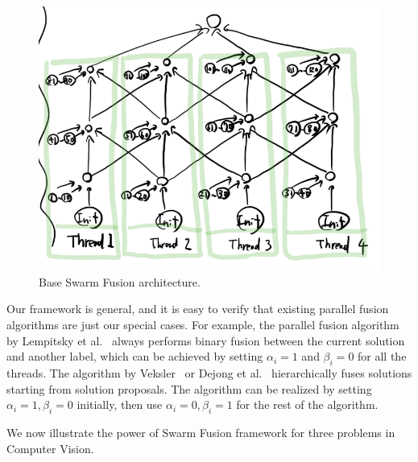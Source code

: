 \begin{figure}[tb]
 \includegraphics[width=\columnwidth]{figure/base_illustration.png}
 \caption{Base Swarm Fusion architecture.}\label{fig:base}
\end{figure}

 Our framework is
general, and it is easy to verify that existing parallel fusion
algorithms are just our special cases.
%
For example, the parallel fusion algorithm by Lempitsky et
al.~\cite{viktor} always performs binary fusion between the current
solution and another label, which can be achieved by setting $\alpha_i =
1$ and $\beta_i = 0$ for all the threads. The algorithm by
Veksler~\cite{olga} or Dejong et al.~\cite{dejong} hierarchically fuses
solutions starting from solution proposals. The algorithm can be
realized by setting $\alpha_i = 1, \beta_i = 0$ initially, then use
$\alpha_i = 0, \beta_i=1$  for the rest of the algorithm.

\noindent
We now illustrate the power of Swarm Fusion framework for three problems
in Computer Vision. 






